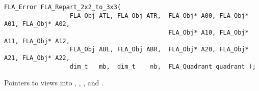 \begin{flaspec}
\begin{verbatim}
FLA_Error FLA_Repart_2x2_to_3x3(
                  FLA_Obj ATL, FLA_Obj ATR,  FLA_Obj* A00, FLA_Obj* A01, FLA_Obj* A02,
                                             FLA_Obj* A10, FLA_Obj* A11, FLA_Obj* A12,
                  FLA_Obj ABL, FLA_Obj ABR,  FLA_Obj* A20, FLA_Obj* A21, FLA_Obj* A22,
                  dim_t   mb,  dim_t    nb,  FLA_Quadrant quadrant );
\end{verbatim}
\rvalue{
\flasuccess
}
\begin{params}
                               {Pointers to \flaobj views into \ATLns, \ATRns, \ABLns, and \ABRns.}

\end{params}
\end{flaspec}
